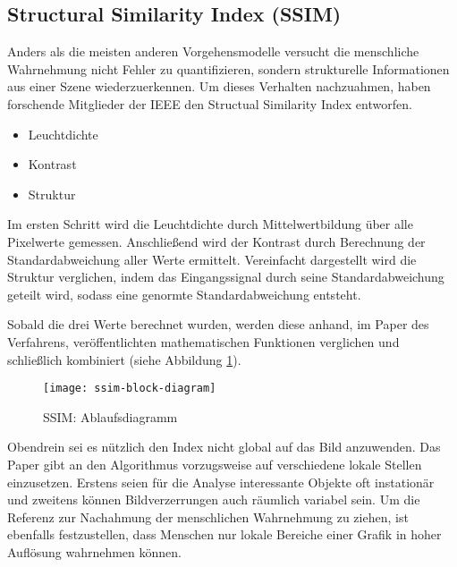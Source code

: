 \subsection{Structural Similarity Index (SSIM)}
Anders als die meisten anderen Vorgehensmodelle versucht die menschliche
Wahrnehmung nicht Fehler zu quantifizieren, sondern strukturelle Informationen
aus einer Szene wiederzuerkennen. Um dieses Verhalten nachzuahmen, haben
forschende Mitglieder der IEEE den Structual Similarity Index entworfen.
\parencite{ssim-orig-paper}

\begin{itemize}[topsep=0pt]
    \item Leuchtdichte
    \item Kontrast
    \item Struktur
\end{itemize}

Im ersten Schritt wird die Leuchtdichte durch Mittelwertbildung über alle
Pixelwerte gemessen. Anschließend wird der Kontrast durch Berechnung der
Standardabweichung aller Werte ermittelt. Vereinfacht dargestellt wird die
Struktur verglichen, indem das Eingangssignal durch seine Standardabweichung
geteilt wird, sodass eine genormte Standardabweichung entsteht.
\parencite{ssim-summary}

Sobald die drei Werte berechnet wurden, werden diese anhand, im Paper des
Verfahrens, veröffentlichten mathematischen Funktionen verglichen und
schließlich kombiniert (siehe Abbildung \ref{fig:ssim-block-diagram}).
\parencite{ssim-summary}

\begin{figure}[H]
    \centering
    \texttt{[image: ssim-block-diagram]}
    \caption{SSIM: Ablaufsdiagramm}
    \label{fig:ssim-block-diagram}
\end{figure}

Obendrein sei es nützlich den Index nicht global auf das Bild anzuwenden. Das
Paper gibt an den Algorithmus vorzugsweise auf verschiedene lokale Stellen
einzusetzen. Erstens seien für die Analyse interessante Objekte oft instationär
und zweitens können Bildverzerrungen auch räumlich variabel sein. Um die
Referenz zur Nachahmung der menschlichen Wahrnehmung zu ziehen, ist ebenfalls
festzustellen, dass Menschen nur lokale Bereiche einer Grafik in hoher Auflösung 
wahrnehmen können. \parencite{ssim-summary}

